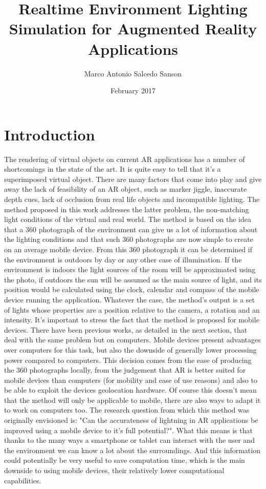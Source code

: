 \documentclass{article}
\title{Realtime Environment Lighting Simulation for Augmented Reality  Applications}
\author{Marco Antonio Salcedo Sanson }
\date{February 2017}
\begin{document}
\maketitle

\section{Introduction}
The rendering of virtual objects on current AR applications has a number of shortcomings in the state of the art. It is quite easy to tell that it’s a superimposed virtual object. There are many factors that come into play and give away the lack of feasibility of an AR object, such as marker jiggle, inaccurate depth cues, lack of occlusion from real life objects and incompatible lighting.
The method proposed in this work addresses the latter problem, the non-matching light conditions of the virtual and real world. The method is based on the idea that a 360 photograph of the environment can give us a lot of information about the lighting conditions and that such 360 photographs are now simple to create on an average mobile device. From this 360 photograph it can be determined if the environment is outdoors by day or any other case of illumination. If the environment is indoors the light sources of the room will be approximated using the photo, if outdoors the sun will be assumed as the main source of light, and its position would be calculated using the clock, calendar and compass of the mobile device running the application. \newline
Whatever the case, the method's output is a set of lights whose properties are a position relative to the camera, a rotation and an intensity.
It's important to stress the fact that the method is proposed for mobile devices. There have been previous works, as detailed in the next section, that deal with the same problem but on computers. Mobile devices present advantages over computers for this task, but also the downside of generally lower processing power compared to computers. This decision comes from the ease of producing the 360 photographs locally, from the judgement that AR is better suited for mobile devices than computers (for mobility and ease of use reasons) and also to be able to exploit the devices geolocation hardware. Of course this doesn't mean that the method will only be applicable to mobile, there are also ways to adapt it to work on computers too.\newline
The research question from which this method was originally envisioned is: "Can the accurateness of lightning in AR applications be improved using a mobile device to it's full potential?". What this means is that thanks to the many ways a smartphone or tablet can interact with the user and the environment we can know a lot about the surroundings. And this information could potentially be very useful to save computation time, which is the main downside to using mobile devices, their relatively lower computational capabilities.\newline
\end{document}
